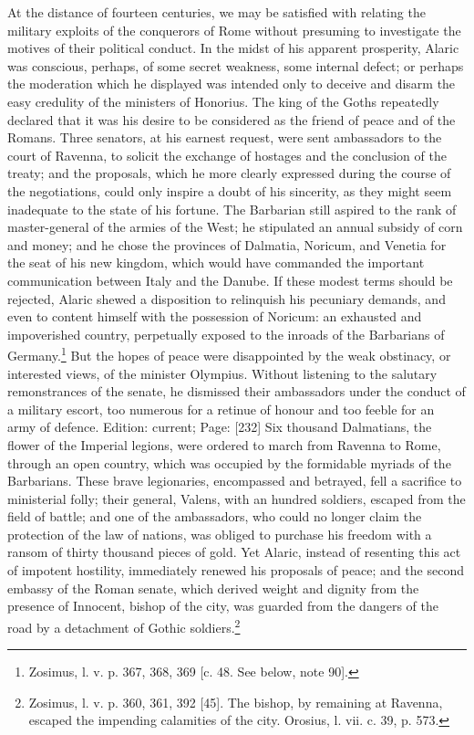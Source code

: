 At the distance of fourteen centuries, we may be satisfied with relating the military exploits of the conquerors of Rome without presuming to investigate the motives of their political conduct. In the midst of his apparent prosperity, Alaric was conscious, perhaps, of some secret weakness, some internal defect; or perhaps the moderation which he displayed was intended only to deceive and disarm the easy credulity of the ministers of Honorius. The king of the Goths repeatedly declared that it was his desire to be considered as the friend of peace and of the Romans. Three senators, at his earnest request, were sent ambassadors to the court of Ravenna, to solicit the exchange of hostages and the conclusion of the treaty; and the proposals, which he more clearly expressed during the course of the negotiations, could only inspire a doubt of his sincerity, as they might seem inadequate to the state of his fortune. The Barbarian still aspired to the rank of master-general of the armies of the West; he stipulated an annual subsidy of corn and money; and he chose the provinces of Dalmatia, Noricum, and Venetia for the seat of his new kingdom, which would have commanded the important communication between Italy and the Danube. If these modest terms should be rejected, Alaric shewed a disposition to relinquish his pecuniary demands, and even to content himself with the possession of Noricum: an exhausted and impoverished country, perpetually exposed to the inroads of the Barbarians of Germany.\footnote{Zosimus, l. v. p. 367, 368, 369 [c. 48. See below, note 90].} But the hopes of peace were disappointed by the weak obstinacy, or interested views, of the minister Olympius. Without listening to the salutary remonstrances of the senate, he dismissed their ambassadors under the conduct of a military escort, too numerous for a retinue of honour and too feeble for an army of defence. Edition: current; Page: [232] Six thousand Dalmatians, the flower of the Imperial legions, were ordered to march from Ravenna to Rome, through an open country, which was occupied by the formidable myriads of the Barbarians. These brave legionaries, encompassed and betrayed, fell a sacrifice to ministerial folly; their general, Valens, with an hundred soldiers, escaped from the field of battle; and one of the ambassadors, who could no longer claim the protection of the law of nations, was obliged to purchase his freedom with a ransom of thirty thousand pieces of gold. Yet Alaric, instead of resenting this act of impotent hostility, immediately renewed his proposals of peace; and the second embassy of the Roman senate, which derived weight and dignity from the presence of Innocent, bishop of the city, was guarded from the dangers of the road by a detachment of Gothic soldiers.\footnote{Zosimus, l. v. p. 360, 361, 392 [45]. The bishop, by remaining at Ravenna, escaped the impending calamities of the city. Orosius, l. vii. c. 39, p. 573.}

